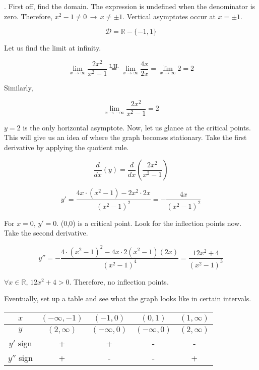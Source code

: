 \documentclass{article}
\begin{document}
. First off, find the domain. The expression is undefined when the denominator is zero. Therefore, $x^2-1 \neq 0 \,\rightarrow\, x\neq \pm 1$. Vertical asymptotes occur at $x = \pm 1$.

\[\mathcal{D} = \mathbb{R} - \{-1, 1\} \]

\hfill

\noindent Let us find the limit at infinity.

\[\lim_{x\to \infty} \frac{2x^2}{x^2-1} \overset{\text{L'H.}}{=} \lim_{x\to \infty} \frac{4x}{2x} = \lim_{x\to \infty} 2 = 2\]

\noindent Similarly,

\[\lim_{x\to -\infty} \frac{2x^2}{x^2-1} = 2\]

\hfill

\noindent $y=2$ is the only horizontal asymptote. Now, let us glance at the critical points. This will give us an idea of where the graph becomes stationary. Take the first derivative by applying the quotient rule.

\[\frac{d}{dx}(y)=\frac{d}{dx}\left(\frac{2x^2}{x^2-1}\right)\]

\[y'=\frac{4x\cdot(x^2-1)-2x^2\cdot 2x}{\left(x^2-1\right)^2}=-\frac{4x}{\left(x^2-1\right)^2} \]

\hfill

\noindent For $x=0$, $y'=0$. (0,0) is a critical point. Look for the inflection points now. Take the second derivative.

\[y''=-\frac{4\cdot\left(x^2-1\right)^2-4x\cdot2\left(x^2-1\right)(2x)}{\left(x^2-1\right)^4}=\frac{12x^2+4}{\left(x^2-1\right)^3}\]

\hfill

\noindent $\forall x \in \mathbb{R},\,12x^2+4 > 0$. Therefore, no inflection points.

\hfill

\noindent Eventually, set up a table and see what the graph looks like in certain intervals.

\begin{center}
    \large
    \begin{tabular}{ |c| c c c c| } 
    \hline
        $x$ & $(-\infty, -1)$ & $(-1, 0)$ & $(0, 1)$ &  $(1, \infty)$ \\
        \hline
        $y$ & $(2, \infty)$ & $(-\infty, 0)$ & $(-\infty, 0)$ & $(2, \infty)$\\
        \hline
        $y'$ sign & + & + & - & - \\
        \hline
        $y''$ sign & + & - & - & + \\
        \hline
    \end{tabular}
\end{center}
\end{document}
